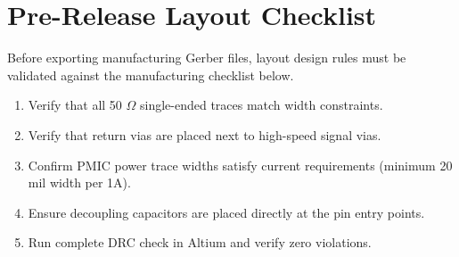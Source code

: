 \section{Pre-Release Layout Checklist}
Before exporting manufacturing Gerber files, layout design rules must be validated against the manufacturing checklist below.

\begin{enumerate}[label=\lbrack\ \rbrack, leftmargin=*]
    \item Verify that all 50 $\Omega$ single-ended traces match width constraints.
    \item Verify that return vias are placed next to high-speed signal vias.
    \item Confirm PMIC power trace widths satisfy current requirements (minimum 20 mil width per 1A).
    \item Ensure decoupling capacitors are placed directly at the pin entry points.
    \item Run complete DRC check in Altium and verify zero violations.
\end{enumerate}
